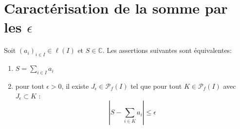 \documentclass[../main.tex]{subfiles}
\begin{document}
\section{Caractérisation de la somme par les $\epsilon$}
\begin{tcolorbox}[title=Propostion 35.27, title filled=false, colframe=lightblue, colback=lightblue!10!white]
    Soit $\left(a_i\right)_{i \in I} \in \ell(I)$ et $S \in \mathbb{C}$. Les assertions suivantes sont équivalentes:
    \begin{enumerate}
        \item $S=\sum\limits_{i \in I} a_i$
        \item pour tout $\epsilon>0$, il existe $J_\epsilon \in \mathcal{P}_f(I)$ tel que pour tout $K \in \mathcal{P}_f(I)$ avec $J_\epsilon \subset K$ : 
        $$\left|S-\sum_{i \in K} a_i\right| \leq \epsilon$$
    \end{enumerate}
\end{tcolorbox}
\end{document}
